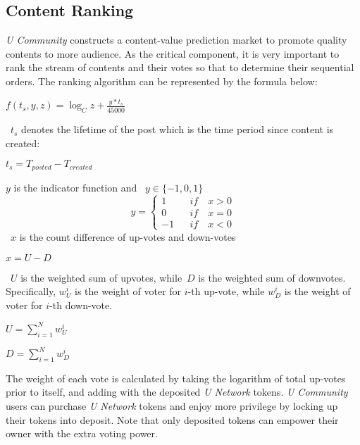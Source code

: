 \subsection{Content Ranking}

\emph{U Community} constructs a content-value prediction market to promote quality contents to more audience. As the critical component, it is very important to rank the stream of contents and their votes so that to determine their sequential orders. The ranking algorithm can be represented by the formula below:
\begin{center}
$f(t_s,y,z) = \log_{C} z + \frac{y * t_s}{45000}$
\end{center}
\  $t_s$ denotes the lifetime of the post which is the time period since content is created:
\begin{center}
    $t_s = T_{posted} - T_{created}$
\end{center}
$y$ is the indicator function and \ $y \in \{-1,0,1\}$
$$y =\left\{
\begin{array}{rcl}
1       &      & {if \quad x > 0}\\
0     &      & {if \quad x = 0}\\
-1     &      & {if \quad x < 0}
\end{array} \right. $$
\ $x$ is the count difference of up-votes and down-votes
\begin{center}
        $x = U - D$
\end{center}
\  $U$ is the weighted sum of upvotes, while\ $D$ is the weighted sum of downvotes. Specifically, $w_{U}^{i}$ is the weight of voter for $i$-th up-vote, while $w_{D}^{i}$ is the weight of voter for $i$-th down-vote.
\begin{center}
$U = \sum_{i=1}^{N} w_{U}^{i}$
\end{center}
\begin{center}
$D = \sum_{i=1}^{N} w_{D}^{i}$
\end{center}

The weight of each vote is calculated by taking the logarithm of total up-votes prior to itself, and adding with the deposited \emph{U Network} tokens. \emph{U Community}  users can purchase \emph{U Network} tokens and enjoy more privilege by locking up their tokens into deposit. Note that only deposited tokens can empower their owner with the extra voting power. \par

